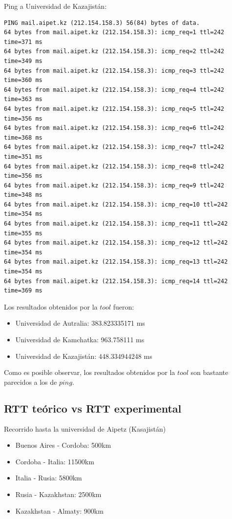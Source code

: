 Ping a Universidad de Kazajistán:

\begin{verbatim}
PING mail.aipet.kz (212.154.158.3) 56(84) bytes of data.
64 bytes from mail.aipet.kz (212.154.158.3): icmp_req=1 ttl=242 time=371 ms
64 bytes from mail.aipet.kz (212.154.158.3): icmp_req=2 ttl=242 time=349 ms
64 bytes from mail.aipet.kz (212.154.158.3): icmp_req=3 ttl=242 time=360 ms
64 bytes from mail.aipet.kz (212.154.158.3): icmp_req=4 ttl=242 time=363 ms
64 bytes from mail.aipet.kz (212.154.158.3): icmp_req=5 ttl=242 time=356 ms
64 bytes from mail.aipet.kz (212.154.158.3): icmp_req=6 ttl=242 time=368 ms
64 bytes from mail.aipet.kz (212.154.158.3): icmp_req=7 ttl=242 time=351 ms
64 bytes from mail.aipet.kz (212.154.158.3): icmp_req=8 ttl=242 time=356 ms
64 bytes from mail.aipet.kz (212.154.158.3): icmp_req=9 ttl=242 time=348 ms
64 bytes from mail.aipet.kz (212.154.158.3): icmp_req=10 ttl=242 time=354 ms
64 bytes from mail.aipet.kz (212.154.158.3): icmp_req=11 ttl=242 time=355 ms
64 bytes from mail.aipet.kz (212.154.158.3): icmp_req=12 ttl=242 time=354 ms
64 bytes from mail.aipet.kz (212.154.158.3): icmp_req=13 ttl=242 time=354 ms
64 bytes from mail.aipet.kz (212.154.158.3): icmp_req=14 ttl=242 time=369 ms
\end{verbatim}

Los resultados obtenidos por la $tool$ fueron:

\begin{itemize}
	\item Universidad de Autralia: 383.823335171 ms
	\item Universidad de Kamchatka: 963.758111 ms
	\item Universidad de Kazajistán: 448.334944248 ms
\end{itemize}

Como es posible observar, los resultados obtenidos por la $tool$ son bastante parecidos a los de $ping$.

\subsection{RTT teórico vs RTT experimental}

Recorrido hasta la universidad de Aipetz (Kasajistán)

\begin{itemize}
	\item Buenos Aires - Cordoba: 500km
	\item Cordoba - Italia: 11500km
	\item Italia - Rusia: 5800km
	\item Rusia - Kazakhstan: 2500km
	\item Kazakhstan - Almaty:  900km
\end{itemize}

